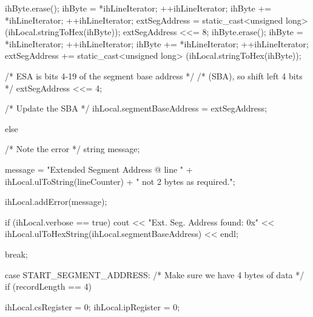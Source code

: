 \begin{DoxyCode}
{{{{{{                            ihByte.erase();
                            ihByte = *ihLineIterator;
                            ++ihLineIterator;
                            ihByte += *ihLineIterator;
                            ++ihLineIterator;
                            extSegAddress = static_cast<unsigned long>
                                                  (ihLocal.stringToHex(ihByte));
                            extSegAddress <<= 8;
                            ihByte.erase();
                            ihByte = *ihLineIterator;
                            ++ihLineIterator;
                            ihByte += *ihLineIterator;
                            ++ihLineIterator;
                            extSegAddress += static_cast<unsigned long>
                                                  (ihLocal.stringToHex(ihByte));
                            
                            /* ESA is bits 4-19 of the segment base address   */
                            /* (SBA), so shift left 4 bits                    */
                            extSegAddress <<= 4;
                            
                            /* Update the SBA                                 */
                            ihLocal.segmentBaseAddress = extSegAddress;
                        }
                        else
                        {
                            /* Note the error                                 */
                            string message;
                            
                            message = "Extended Segment Address @ line " +
                                      ihLocal.ulToString(lineCounter) + 
                                      " not 2 bytes as required.";
                            
                            ihLocal.addError(message);
                        }
                        if (ihLocal.verbose == true)
                        {
                            cout << "Ext. Seg. Address found: 0x" <<
                               ihLocal.ulToHexString(ihLocal.segmentBaseAddress)
                                                                        << endl;
                        }
                        
                        break;
                        
                    case START_SEGMENT_ADDRESS:
                        /* Make sure we have 4 bytes of data                  */
                        if (recordLength == 4)
                        {
                            ihLocal.csRegister = 0;
                            ihLocal.ipRegister = 0;
                            
}}}}}}
\end{DoxyCode}
